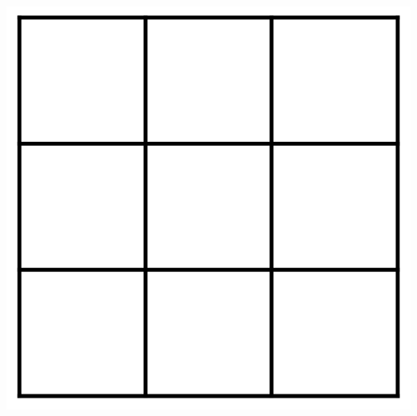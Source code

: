 \documentclass[11pt,letterpaper]{article}
\begin{document}
\begin{enumerate}
    \includegraphics[scale=0.4]{grid.png}
    \pagebreak


\end{enumerate}
\end{document}
